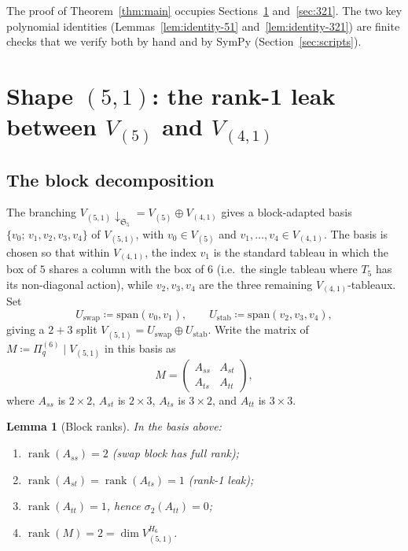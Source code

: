 \documentclass[11pt]{article}
\theoremstyle{plain}
\newtheorem{lemma}[theorem]{Lemma}
\theoremstyle{definition}
\theoremstyle{remark}
\newcommand{\Sym}{\mathfrak{S}}
\newcommand{\Pibs}{\Pi_q}
\begin{document}
The proof of Theorem~\ref{thm:main} occupies Sections~\ref{sec:51} and~\ref{sec:321}.
The two key polynomial identities (Lemmas~\ref{lem:identity-51} and~\ref{lem:identity-321})
are finite checks that we verify both by hand and by SymPy
(Section~\ref{sec:scripts}).

\section{Shape $(5,1)$: the rank-1 leak between $V_{(5)}$ and $V_{(4,1)}$}\label{sec:51}

\subsection{The block decomposition}

The branching $V_{(5,1)}\downarrow_{\Sym_5} = V_{(5)} \oplus V_{(4,1)}$
gives a block-adapted basis $\{v_0;\, v_1,v_2,v_3,v_4\}$ of $V_{(5,1)}$,
with $v_0 \in V_{(5)}$ and $v_1,\ldots,v_4 \in V_{(4,1)}$. The basis is
chosen so that within $V_{(4,1)}$, the index $v_1$ is the standard tableau
in which the box of $5$ shares a column with the box of $6$ (i.e.\ the
single tableau where $T_5$ has its non-diagonal action), while
$v_2,v_3,v_4$ are the three remaining $V_{(4,1)}$-tableaux. Set
\[
  U_{\mathrm{swap}} \coloneqq \mathrm{span}(v_0, v_1), \qquad
  U_{\mathrm{stab}} \coloneqq \mathrm{span}(v_2, v_3, v_4),
\]
giving a $2 + 3$ split $V_{(5,1)} = U_{\mathrm{swap}} \oplus U_{\mathrm{stab}}$.
Write the matrix of $M \coloneqq \Pibs^{(6)} \mid V_{(5,1)}$ in this basis as
\[
  M = \begin{pmatrix} A_{ss} & A_{st} \\ A_{ts} & A_{tt} \end{pmatrix},
\]
where $A_{ss}$ is $2\times 2$, $A_{st}$ is $2\times 3$, $A_{ts}$ is $3\times 2$,
and $A_{tt}$ is $3\times 3$.

\begin{lemma}[Block ranks]\label{lem:51-blocks}
In the basis above:
\begin{enumerate}[label=(\roman*),itemsep=0pt]
\item $\operatorname{rank}(A_{ss}) = 2$ \emph{(swap block has full rank)};
\item $\operatorname{rank}(A_{st}) = \operatorname{rank}(A_{ts}) = 1$ \emph{(rank-1 leak)};
\item $\operatorname{rank}(A_{tt}) = 1$, hence $\sigma_2(A_{tt}) = 0$;
\item $\operatorname{rank}(M) = 2 = \dim V_{(5,1)}^{H_6}$.
\end{enumerate}
\end{lemma}
\end{document}
